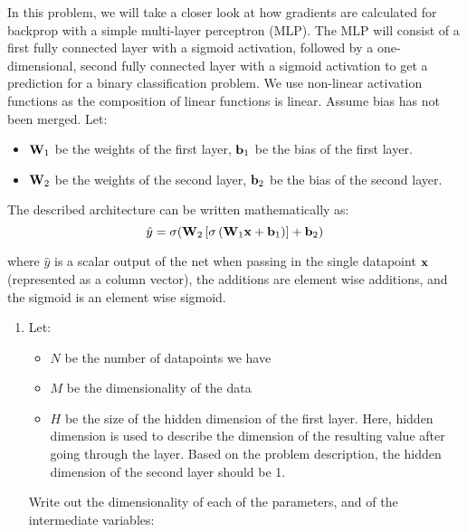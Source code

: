 \documentclass[submit]{harvardml}
\begin{document}
\newpage


\begin{problem}

In this problem, we will take a closer look at how gradients are calculated for backprop with a simple multi-layer perceptron (MLP). The MLP will consist of a first fully connected layer with a sigmoid activation, followed by a one-dimensional, second fully connected layer with a sigmoid activation to get a prediction for a binary classification problem. We use non-linear activation functions as the composition of linear functions is linear. Assume bias has not been merged. Let:
\begin{itemize}
  \item $\bold{W}_1$ be the weights of the first layer, $\bold{b}_1$ be the bias of the first layer.
  \item $\bold{W}_2$ be the weights of the second layer, $\bold{b}_2$ be the bias of the second layer.
\end{itemize}

The described architecture can be written mathematically as: $$\hat{y} = \sigma(\bold{W}_2 \left[\sigma \left(\bold{W}_1 \bold{x} + \bold{b}_1\right)\right] + \bold{b}_2)$$

where $\hat{y}$ is a scalar output of the net when passing in the single datapoint $\bold{x}$ (represented as a column vector), the additions are element wise additions, and the sigmoid is an element wise sigmoid.

\begin{enumerate}
  \item Let:
        \begin{itemize}
          \item $N$ be the number of datapoints we have
          \item $M$ be the dimensionality of the data
          \item $H$ be the size of the hidden dimension of the first layer. Here, hidden dimension is used to describe the dimension of the resulting value after going through the layer. Based on the problem description, the hidden dimension of the second layer should be 1.
        \end{itemize}

        Write out the dimensionality of each of the parameters, and of the intermediate variables:


\end{enumerate}
\end{problem}
\end{document}
